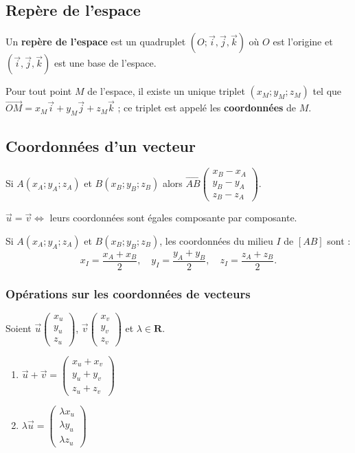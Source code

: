 \documentclass[11pt,a4paper,openany]{book}
\theoremstyle{definition}
\newcommand{\vc}[1]{\overrightarrow{#1}}
\newcommand{\vcb}[3]{
    \left(\begin{array}{c}
        #1\\
        #2\\
        #3
    \end{array}\right)}
\begin{document}
    \subsection{Repère de l'espace}
    \begin{Propriété}
        Un \textbf{repère de l'espace} est un quadruplet $(O;\vc{i},\vc{j},\vc{k})$ où $O$
        est l'origine et $(\vc{i},\vc{j},\vc{k})$ est une base de l'espace.
    \end{Propriété}

    \begin{Propriété}
        Pour tout point $M$ de l'espace, il existe un unique triplet $(x_M;y_M;z_M)$ tel que
        $\vc{OM}=x_M\vc{i}+y_M\vc{j}+z_M\vc{k}$ ; ce triplet est appelé les
        \textbf{coordonnées} de $M$.
    \end{Propriété}

    \subsection{Coordonnées d'un vecteur}
    \begin{Propriété}
        Si $A(x_A;y_A;z_A)$ et $B(x_B;y_B;z_B)$ alors
        $\vc{AB}\vcb{x_B-x_A}{y_B-y_A}{z_B-z_A}$.
    \end{Propriété}

    \begin{Propriété}
        $\vc{u}=\vc{v}\Longleftrightarrow$ leurs coordonnées sont égales composante par composante.
    \end{Propriété}

    \begin{Propriété}
        Si $A(x_A;y_A;z_A)$ et $B(x_B;y_B;z_B)$, les coordonnées du milieu $I$ de $[AB]$ sont :
        \[
            x_I=\frac{x_A+x_B}{2},\quad y_I=\frac{y_A+y_B}{2},\quad z_I=\frac{z_A+z_B}{2}.
        \]
    \end{Propriété}

    \subsubsection{Opérations sur les coordonnées de vecteurs}
    \begin{Propriété}
        Soient $\vc{u}\vcb{x_u}{y_u}{z_u}$, $\vc{v}\vcb{x_v}{y_v}{z_v}$ et $\lambda\in\mathbf{R}$.
        \begin{enumerate}
            \item $\vc{u}+\vc{v}=\vcb{x_u+x_v}{y_u+y_v}{z_u+z_v}$
            \item $\lambda\vc{u}=\vcb{\lambda x_u}{\lambda y_u}{\lambda z_u}$
        \end{enumerate}
    \end{Propriété}
\end{document}
